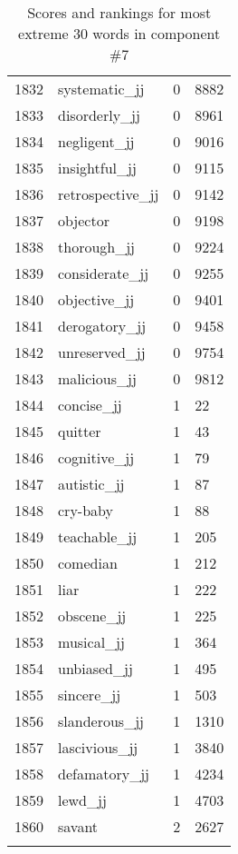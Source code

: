 \begin{longtable}[!htbp]{| rlr@{.}l |}
    1832 & systematic\_jj & 0 & 8882 \\
    1833 & disorderly\_jj & 0 & 8961 \\
    1834 & negligent\_jj & 0 & 9016 \\
    1835 & insightful\_jj & 0 & 9115 \\
    1836 & retrospective\_jj & 0 & 9142 \\
    1837 & objector & 0 & 9198 \\
    1838 & thorough\_jj & 0 & 9224 \\
    1839 & considerate\_jj & 0 & 9255 \\
    1840 & objective\_jj & 0 & 9401 \\
    1841 & derogatory\_jj & 0 & 9458 \\
    1842 & unreserved\_jj & 0 & 9754 \\
    1843 & malicious\_jj & 0 & 9812 \\
    1844 & concise\_jj & 1 & 22 \\
    1845 & quitter & 1 & 43 \\
    1846 & cognitive\_jj & 1 & 79 \\
    1847 & autistic\_jj & 1 & 87 \\
    1848 & cry-baby & 1 & 88 \\
    1849 & teachable\_jj & 1 & 205 \\
    1850 & comedian & 1 & 212 \\
    1851 & liar & 1 & 222 \\
    1852 & obscene\_jj & 1 & 225 \\
    1853 & musical\_jj & 1 & 364 \\
    1854 & unbiased\_jj & 1 & 495 \\
    1855 & sincere\_jj & 1 & 503 \\
    1856 & slanderous\_jj & 1 & 1310 \\
    1857 & lascivious\_jj & 1 & 3840 \\
    1858 & defamatory\_jj & 1 & 4234 \\
    1859 & lewd\_jj & 1 & 4703 \\
    1860 & savant & 2 & 2627 \\
    \hline
    \caption{Scores and rankings for most extreme 30 words in component \#7} \\
\end{longtable}
